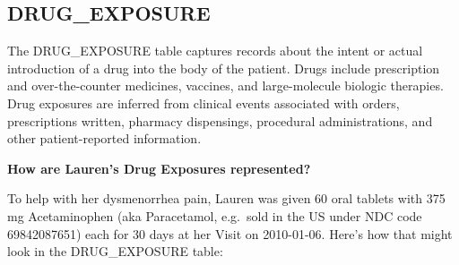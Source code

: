 \documentclass[11pt]{book}
\theoremstyle{definition}
\theoremstyle{definition}
\theoremstyle{definition}
\theoremstyle{remark}
\begin{document}
\hypertarget{drugExposure}{%
\subsection{DRUG\_EXPOSURE}\label{drugExposure}}

The DRUG\_EXPOSURE table captures records about the intent or actual introduction of a drug into the body of the patient. Drugs include prescription and over-the-counter medicines, vaccines, and large-molecule biologic therapies. Drug exposures are inferred from clinical events associated with orders, prescriptions written, pharmacy dispensings, procedural administrations, and other patient-reported information.

\textbf{How are Lauren's Drug Exposures represented?}

To help with her dysmenorrhea pain, Lauren was given 60 oral tablets with 375 mg Acetaminophen (aka Paracetamol, e.g.~sold in the US under NDC code 69842087651) each for 30 days at her Visit on 2010-01-06. Here's how that might look in the DRUG\_EXPOSURE table:
\end{document}
